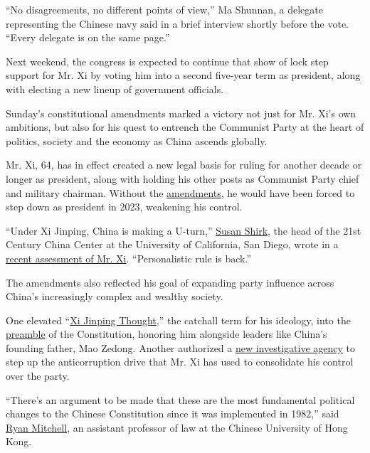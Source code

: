 ``No disagreements, no different points of view,'' Ma Shunnan, a
delegate representing the Chinese navy said in a brief interview shortly
before the vote. ``Every delegate is on the same page.''

Next weekend, the congress is expected to continue that show of lock
step support for Mr. Xi by voting him into a second five-year term as
president, along with electing a new lineup of government officials.

Sunday's constitutional amendments marked a victory not just for Mr.
Xi's own ambitions, but also for his quest to entrench the Communist
Party at the heart of politics, society and the economy as China ascends
globally.

Mr. Xi, 64, has in effect created a new legal basis for ruling for
another decade or longer as president, along with holding his other
posts as Communist Party chief and military chairman. Without the
\href{http://www.npc.gov.cn/npc/dbdhhy/13_1/2018-03/06/content_2042508.htm}{amendments},
he would have been forced to step down as president in 2023, weakening
his control.

``Under Xi Jinping, China is making a U-turn,''
\href{https://gps.ucsd.edu/faculty-directory/susan-shirk.html}{Susan
Shirk}, the head of the 21st Century China Center at the University of
California, San Diego, wrote in a
\href{https://www.journalofdemocracy.org/sites/default/files/media/29.2\%E2\%80\%94Shirk\%E2\%80\%94AdvanceVersion.pdf}{recent
assessment of Mr. Xi}. ``Personalistic rule is back.''

The amendments also reflected his goal of expanding party influence
across China's increasingly complex and wealthy society.

One elevated
``\href{https://www.nytimes3xbfgragh.onion/2018/02/26/world/asia/xi-jinping-thought-explained-a-new-ideology-for-a-new-era.html}{Xi
Jinping Thought},'' the catchall term for his ideology, into the
\href{http://www.hkhrm.org.hk/english/law/const01.html}{preamble} of the
Constitution, honoring him alongside leaders like China's founding
father, Mao Zedong. Another authorized a
\href{https://www.nytimes3xbfgragh.onion/2017/11/29/world/asia/china-xi-jinping-anticorruption.html}{new
investigative agency} to step up the anticorruption drive that Mr. Xi
has used to consolidate his control over the party.

``There's an argument to be made that these are the most fundamental
political changes to the Chinese Constitution since it was implemented
in 1982,'' said
\href{https://www.law.cuhk.edu.hk/en/people/info.php?id=237}{Ryan
Mitchell}, an assistant professor of law at the Chinese University of
Hong Kong.

